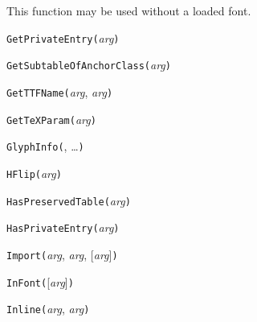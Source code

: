 This function may be used without a loaded font.



\texttt{GetPrivateEntry(}\textit{arg}\texttt{)}



\texttt{GetSubtableOfAnchorClass(}\textit{arg}\texttt{)}



\texttt{GetTTFName(}\textit{arg}, \textit{arg}\texttt{)}



\texttt{GetTeXParam(}\textit{arg}\texttt{)}



\texttt{GlyphInfo(}, \ldots\texttt{)}



\texttt{HFlip(}\textit{arg}\texttt{)}



\texttt{HasPreservedTable(}\textit{arg}\texttt{)}



\texttt{HasPrivateEntry(}\textit{arg}\texttt{)}



\texttt{Import(}\textit{arg}, \textit{arg}, [\textit{arg}]\texttt{)}



\texttt{InFont(}[\textit{arg}]\texttt{)}



\texttt{Inline(}\textit{arg}, \textit{arg}\texttt{)}

